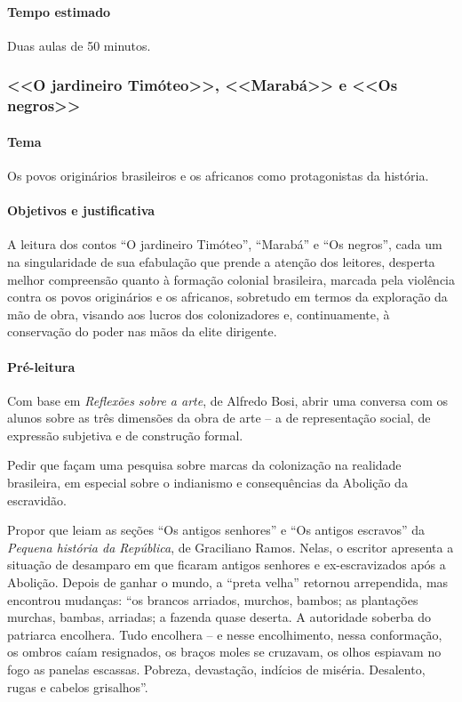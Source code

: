 \documentclass[11pt]{extarticle}
\begin{document}
\paragraph{Tempo estimado} Duas aulas de 50 minutos.

\subsubsection{<<O jardineiro Timóteo>>, <<Marabá>> e <<Os negros>>}

\paragraph{Tema} Os povos originários brasileiros e os africanos como protagonistas da história.

\paragraph{Objetivos e justificativa}
A leitura dos contos ``O jardineiro Timóteo'', ``Marabá'' e ``Os
negros'', cada um na singularidade de sua efabulação que prende a
atenção dos leitores, desperta melhor compreensão quanto à formação
colonial brasileira, marcada pela violência contra os povos originários
e os africanos, sobretudo em termos da exploração da mão de obra,
visando aos lucros dos colonizadores e, continuamente, à conservação do
poder nas mãos da elite dirigente.


\asterisc\paragraph{Pré-leitura}

Com base em \emph{Reflexões sobre a arte}, de Alfredo Bosi, abrir uma
conversa com os alunos sobre as três dimensões da obra de arte -- a de
representação social, de expressão subjetiva e de construção formal.

Pedir que façam uma pesquisa sobre marcas da colonização na realidade
brasileira, em especial sobre o indianismo e consequências da Abolição
da escravidão.

Propor que leiam as seções ``Os antigos senhores'' e ``Os antigos
escravos'' da \emph{Pequena história da República}, de Graciliano Ramos.
Nelas, o escritor apresenta a situação de desamparo em que ficaram
antigos senhores e ex-escravizados após a Abolição. Depois de ganhar o
mundo, a ``preta velha'' retornou arrependida, mas encontrou mudanças:
``os brancos arriados, murchos, bambos; as plantações murchas, bambas,
arriadas; a fazenda quase deserta. A autoridade soberba do patriarca
encolhera. Tudo encolhera -- e nesse encolhimento, nessa conformação, os
ombros caíam resignados, os braços moles se cruzavam, os olhos espiavam
no fogo as panelas escassas. Pobreza, devastação, indícios de miséria.
Desalento, rugas e cabelos grisalhos''.
\end{document}
